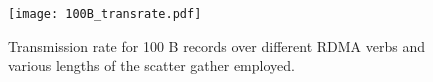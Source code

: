 \begin{figure}[t]
\texttt{[image: 100B\_transrate.pdf]}
\caption{Transmission rate for 100 B records over different RDMA verbs and 
various lengths of the scatter gather employed.}
\label{fig:100B_transrate}
\end{figure}
